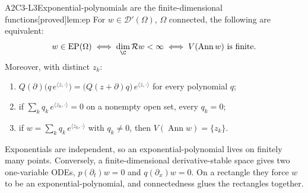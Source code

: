 \documentclass[11pt,a4paper,oneside]{report}
\newcommand{\badge}[2]{\textcolor{#1}{\textsf{\footnotesize[#2]}}}
\newcommand{\proved}{\badge{cC}{proved}}
\newcommand{\Ann}{\operatorname{Ann}}
\newcommand{\EP}{\mathrm{EP}}
\newcommand{\ring}{\mathcal{R}}
\newcommand{\Var}{V}
\DeclareMathOperator{\dimc}{dim}
\newenvironment{dimcard}[5]{\par\Needspace{12\baselineskip}\begin{dimcardbox}{#1}{#2}{#3}{#4}{#5}}{\end{dimcardbox}}
\begin{document}
\begin{dimcard}{A2}{C3-L3}{Exponential-polynomials are the finite-dimensional functions}{\proved}{lem:ep}
For $w\in\mathcal D'(\Omega)$, $\Omega$ connected, the following are equivalent:
\[
w\in\EP(\Omega)\iff\dimc_\C\ring w<\infty\iff\Var(\Ann w)\ \text{is finite.}
\]
Moreover, with distinct $z_k$:
\begin{enumerate}[label=(\alph*)]
\item $Q(\partial)\big(q\,e^{\langle z,\cdot\rangle}\big)=\big(Q(z+\partial)q\big)\,e^{\langle z,\cdot\rangle}$ for every polynomial $q$;
\item if $\sum_kq_k\,e^{\langle z_k,\cdot\rangle}=0$ on a nonempty open set, every $q_k=0$;
\item if $w=\sum_kq_k\,e^{\langle z_k,\cdot\rangle}$ with $q_k\ne0$, then $\Var(\Ann w)=\{z_k\}$.
\end{enumerate}
\end{dimcard}

\begin{proofidea}
Exponentials are independent, so an exponential-polynomial lives on finitely many points. Conversely, a finite-dimensional derivative-stable space gives two one-variable ODEs, $p(\partial_t)w=0$ and $q(\partial_x)w=0$. On a rectangle they force $w$ to be an exponential-polynomial, and connectedness glues the rectangles together.
\end{proofidea}
\end{document}
